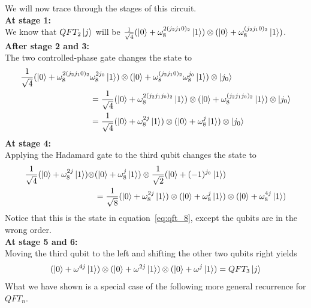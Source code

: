 We will now trace through the stages of this circuit.\\
\textbf{At stage 1:}\\
We know that $QFT_2\ket{j}$ will be $\frac{1}{\sqrt{4}}(\ket{0}+\omega_8^{2(j_2j_10)_2}\ket{1})\otimes (\ket{0}+\omega_8^{(j_2j_10)_2}\ket{1})$.\\
\textbf{After stage 2 and 3:}\\
The two controlled-phase gate changes the state to
\begin{align*}
    \frac{1}{\sqrt{4}}(\ket{0}+\omega_8^{2(j_2j_10)_2}&\omega_8^{2j_0}\ket{1})\otimes (\ket{0}+\omega_8^{(j_2j_10)_2}\omega_8^{j_0}\ket{1})\otimes \ket{j_0}\\
    &=\frac{1}{\sqrt{4}}(\ket{0}+\omega_8^{2(j_2j_1j_0)_2}\ket{1})\otimes(\ket{0}+\omega_8^{(j_2j_1j_0)_2}\ket{1})\otimes \ket{j_0}\\
    &=\frac{1}{\sqrt{4}}(\ket{0}+\omega_8^{2j}\ket{1})\otimes (\ket{0}+\omega_8^j\ket{1})\otimes \ket{j_0}
\end{align*}
\textbf{At stage 4:}\\
Applying the Hadamard gate to the third qubit changes the state to
\begin{align*}
    \frac{1}{\sqrt{4}}(\ket{0}+\omega_8^{2j}\ket{1})\otimes &(\ket{0}+\omega_8^j\ket{1})\otimes\frac{1}{\sqrt{2}}(\ket{0}+(-1)^{j_0}\ket{1})\\
    &=\frac{1}{\sqrt{8}}(\ket{0}+\omega_8^{2j}\ket{1})\otimes (\ket{0}+\omega_8^j\ket{1})\otimes(\ket{0}+\omega_8^{4j}\ket{1})
\end{align*}
Notice that this is the state in equation~\eqref{eq:qft_8}, except the qubits are in the wrong order.\\
\textbf{At stage 5 and 6:}\\
Moving the third qubit to the left and shifting the other two qubits right yields
\[
(\ket{0}+\omega^{4j}\ket{1})\otimes(\ket{0}+\omega^{2j}\ket{1})\otimes (\ket{0}+\omega^j\ket{1})=QFT_3\ket{j}
\]
What we have shown is a special case of the following more general recurrence for $QFT_n$. 
